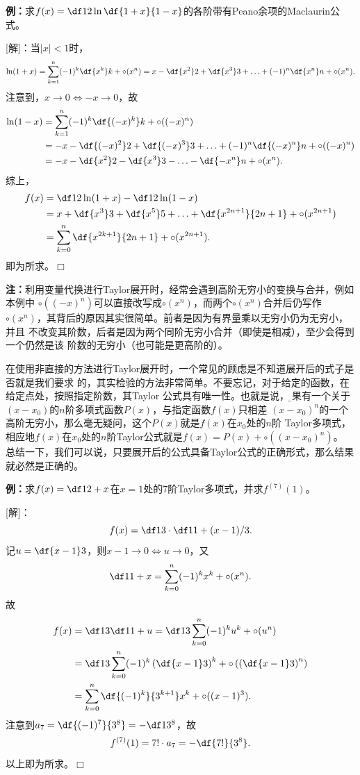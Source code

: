 {\bf 例：}求$f(x)=\df 12\ln\df{1+x}{1-x}$的各阶带有Peano余项的Maclaurin公式。

[解]：当$|x|<1$时，
$$\ln(1+x)=\sum\limits_{k=1}^n(-1)^k\df{x^k}k+\circ(x^n)
=x-\df{x^2}2+\df{x^3}3+\ldots+(-1)^n\df{x^n}n+\circ(x^n).$$
注意到，$x\to0\Leftrightarrow-x\to 0$，故
\begin{align*}
	\ln(1-x)&=\sum\limits_{k=1}^n(-1)^k\df{(-x)^k}k+\circ((-x)^n)\\
	&=-x-\df{(-x)^2}2+\df{(-x)^3}3+\ldots+(-1)^n\df{(-x)^n}n+\circ((-x)^n)\\
	&=-x-\df{x^2}2-\df{x^3}3-\ldots-\df{-x^n}n+\circ(x^n).
\end{align*}
综上，
\begin{align*}
	f(x)&=\df12\ln(1+x)-\df12\ln(1-x)\\
	&=x+\df{x^3}3+\df{x^5}5+\ldots+\df{x^{2n+1}}{2n+1}+\circ(x^{2n+1})\\
	&=\sum\limits_{k=0}^n\df{x^{2k+1}}{2n+1}+\circ(x^{2n+1}).
\end{align*}
即为所求。\hfill$\Box$

{\bf 注：}利用变量代换进行Taylor展开时，经常会遇到高阶无穷小的变换与合并，例如本例中
$\circ((-x)^n)$可以直接改写成$\circ(x^n)$，而两个$\circ(x^n)$合并后仍写作
$\circ(x^n)$，其背后的原因其实很简单。前者是因为有界量乘以无穷小仍为无穷小，并且
不改变其阶数，后者是因为两个同阶无穷小合并（即使是相减），至少会得到一个仍然是该
阶数的无穷小（也可能是更高阶的）。

在使用非直接的方法进行Taylor展开时，一个常见的顾虑是不知道展开后的式子是否就是我们要求
的，其实检验的方法非常简单。不要忘记，对于给定的函数，在给定点处，按照指定阶数，其Taylor
公式具有唯一性。也就是说，{\b 如果有一个关于$(x-x_0)$的$n$阶多项式函数$P(x)$，与指定函数$f(x)$只相差
$(x-x_0)^n$的一个高阶无穷小，那么毫无疑问，这个$P(x)$就是$f(x)$在$x_0$处的$n$阶
Taylor多项式，相应地$f(x)$在$x_0$处的$n$阶Taylor公式就是$f(x)=P(x)+\circ((x-x_0)^n)$。
总结一下，我们可以说，只要展开后的公式具备Taylor公式的正确形式，那么结果就必然是正确的。}

{\bf 例：}求$f(x)=\df 1{2+x}$在$x=1$处的$7$阶Taylor多项式，并求$f^{(7)}(1)$。

[解]：
$$f(x)=\df13\cdot\df1{1+(x-1)/3}.$$
记$u=\df{x-1}3$，则$x-1\to0\Leftrightarrow u\to0$，又
$$\df1{1+x}=\sum\limits_{k=0}^n(-1)^kx^k+\circ(x^n).$$
故
\begin{align*}
	f(x)&=\df13\df1{1+u}
	=\df13\sum\limits_{k=0}^n(-1)^ku^k+\circ(u^n)\\
	&=\df13\sum\limits_{k=0}^n(-1)^k\left(\df{x-1}3\right)^k
	+\circ\left(\left(\df{x-1}3\right)^n\right)\\
	&=\sum\limits_{k=0}^n\df{(-1)^k}{3^{k+1}}x^k
	+\circ((x-1)^3).
\end{align*}
注意到$a_7=\df{(-1)^7}{3^8}=-\df1{3^8}$，故
$$f^{(7)}(1)=7!\cdot a_7=-\df{7!}{3^8}.$$
以上即为所求。\hfill$\Box$

